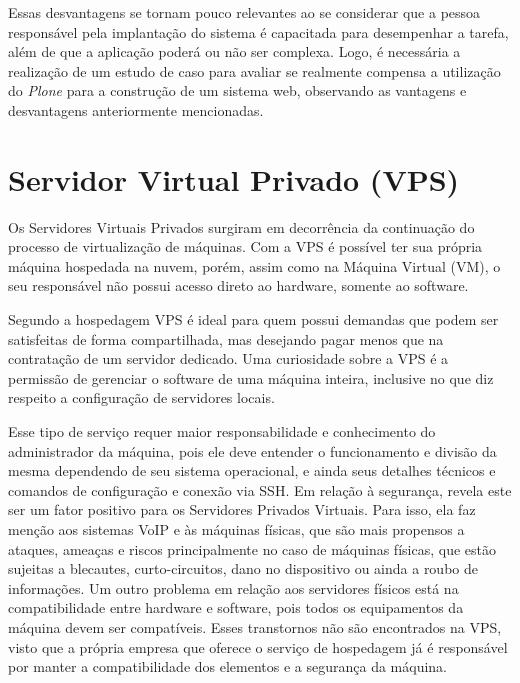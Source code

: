 Essas desvantagens se tornam pouco relevantes ao se considerar que a pessoa responsável pela implantação do sistema é capacitada para desempenhar a tarefa, além de que a aplicação poderá ou não ser complexa. Logo, é necessária a realização de um estudo de caso para avaliar se realmente compensa a utilização do \textit{Plone} para a construção de um sistema web, observando as vantagens e desvantagens anteriormente mencionadas. 

\hspace{2.5cm}

\section{Servidor Virtual Privado (VPS)}
\label{sec:vps}

\hspace{2.5cm}

Os Servidores Virtuais Privados surgiram em decorrência da continuação do processo de virtualização de máquinas. Com a VPS é possível ter sua própria máquina hospedada na nuvem, porém, assim como na Máquina Virtual (VM), o seu responsável não possui acesso direto ao hardware, somente ao software.

Segundo  a hospedagem VPS é ideal para quem possui demandas que podem ser satisfeitas de forma compartilhada, mas desejando pagar menos que na contratação de um servidor dedicado. Uma curiosidade sobre a VPS é a permissão de gerenciar o software de uma máquina inteira, inclusive no que diz respeito a configuração de servidores locais. 

Esse tipo de serviço requer maior responsabilidade e conhecimento do administrador da máquina, pois ele deve entender o funcionamento e divisão da mesma dependendo de seu sistema operacional, e ainda seus detalhes técnicos e comandos de configuração e conexão via SSH. Em relação à segurança, \cite{elizabeth2017diseno} revela este ser um fator positivo para os Servidores Privados Virtuais. Para isso, ela faz menção aos sistemas VoIP e às máquinas físicas, que são mais propensos a ataques, ameaças e riscos principalmente no caso de máquinas físicas, que estão sujeitas a blecautes, curto-circuitos, dano no dispositivo ou ainda a roubo de informações. Um outro problema em relação aos servidores físicos está na compatibilidade entre hardware e software, pois todos os equipamentos da máquina devem ser compatíveis. Esses transtornos não são encontrados na VPS, visto que a própria empresa que oferece o serviço de hospedagem já é responsável por manter a compatibilidade dos elementos e a segurança da máquina.  


